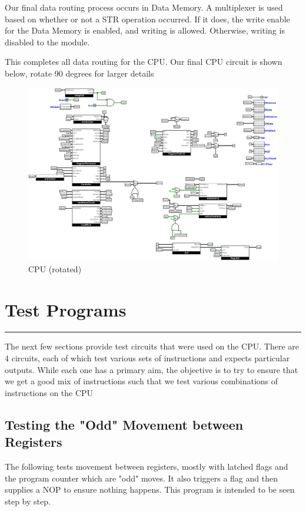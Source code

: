 \documentclass[12pt, letter]{article}
\begin{document}
	Our final data routing process occurs in Data Memory. A multiplexer is used based on whether or not a STR operation occurred. If it does, the write enable for the Data Memory is enabled, and writing is allowed. Otherwise, writing is disabled to the module.
	
	This completes all data routing for the CPU. Our final CPU circuit is shown below, rotate 90 degrees for larger details

	\begin{figure}
		\centering
		\includegraphics[scale = 0.38, angle = -90, origin =c]{CPU}
		\caption{CPU (rotated)}
		\label{fig:rotateCPU}
	\end{figure}

	
	\section{Test Programs}
	\hrule
	The next few sections provide test circuits that were used on the CPU. There are 4 circuits, each of which test various sets of instructions and expects particular outputs. While each one has a primary aim, the objective is to try to ensure that we get a good mix of instructions such that we test various combinations of instructions on the CPU
	
	\subsection{Testing the "Odd" Movement between Registers} 
	
	The following tests movement between registers, mostly with latched flags and the program counter which are "odd" moves. It also triggers a flag and then supplies a NOP to ensure nothing happens. This program is intended to be seen step by step.
	
\end{document}
